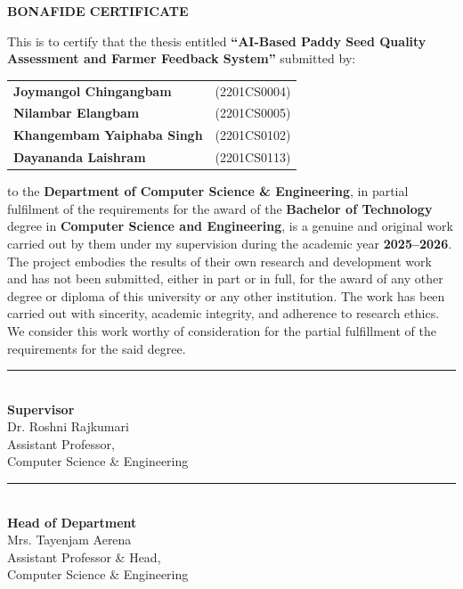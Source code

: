 \vspace{0.6cm}
\begin{center}
    {\fontsize{16}{19}\selectfont\textbf{BONAFIDE CERTIFICATE}}
\end{center}
{
\fontsize{12}{14}\selectfont
\noindent
This is to certify that the thesis entitled \textbf{“AI-Based Paddy Seed Quality Assessment and Farmer Feedback System”} submitted by:
\begin{flushleft}
    \begin{tabular}{@{}l l@{}}
    \textbf{Joymangol Chingangbam} & (2201CS0004) \\
    \textbf{Nilambar Elangbam} & (2201CS0005) \\
    \textbf{Khangembam Yaiphaba Singh} & (2201CS0102) \\
    \textbf{Dayananda Laishram} & (2201CS0113) \\
    \end{tabular}
\end{flushleft}

to the \textbf{Department of Computer Science \& Engineering}, in partial fulfilment of the requirements for the award of the \textbf{Bachelor of Technology} degree in \textbf{Computer Science and Engineering}, is a genuine and original work carried out by them under my supervision during the academic year \textbf{2025–2026}.\\

\noindent
The project embodies the results of their own research and development work and has not been submitted, either in part or in full, for the award of any other degree or diploma of this university or any other institution. The work has been carried out with sincerity, academic integrity, and adherence to research ethics.\\

\noindent
We consider this work worthy of consideration for the partial fulfillment of the requirements for the said degree.\\

\vfill

\noindent
\begin{minipage}[t]{0.48\textwidth}
    \raggedright
    \rule{5cm}{0.4pt}\\[0.5em]
    \textbf{Supervisor}\\[0.3em]
    Dr. Roshni Rajkumari\\
    Assistant Professor,\\
    Computer Science \& Engineering
\end{minipage}%
\hfill
\begin{minipage}[t]{0.48\textwidth}
    \raggedleft
    \begin{minipage}[t]{6cm}
        \raggedright
        \rule{5cm}{0.4pt}\\[0.5em]
        \textbf{Head of Department}\\[0.3em]
        Mrs. Tayenjam Aerena\\
        Assistant Professor \& Head,\\
        Computer Science \& Engineering
    \end{minipage}
\end{minipage}
}